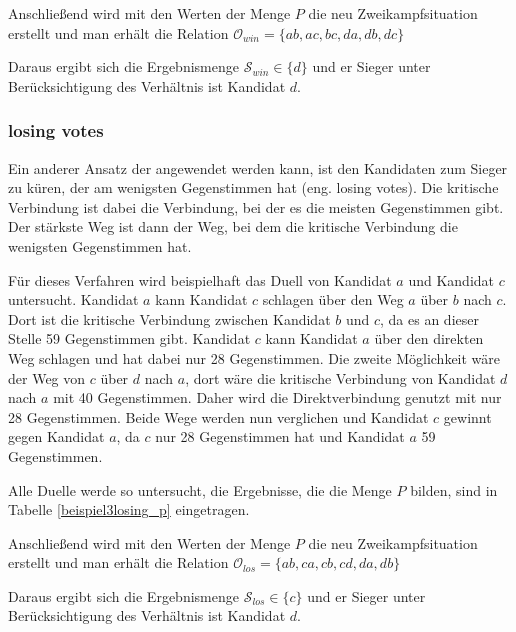 


Anschließend wird mit den Werten der Menge $P$ die neu Zweikampfsituation erstellt und man erhält die Relation $\mathcal{O}_{win} = \{ ab,ac,bc,da,db,dc \}$

Daraus ergibt sich die Ergebnismenge $\mathcal{S}_{win} \in \{d\}$ und er Sieger unter Berücksichtigung des Verhältnis ist Kandidat $d$.


\subsubsection{losing votes}
\label{sec:lose}
Ein anderer Ansatz der angewendet werden kann, ist den Kandidaten zum Sieger zu küren, der am wenigsten Gegenstimmen hat (eng. losing votes). Die kritische Verbindung ist dabei die Verbindung, bei der es die meisten Gegenstimmen gibt. Der stärkste Weg ist dann der Weg, bei dem die kritische Verbindung die wenigsten Gegenstimmen hat.

Für dieses Verfahren wird beispielhaft das Duell von Kandidat $a$ und Kandidat $c$ untersucht. Kandidat $a$ kann Kandidat $c$ schlagen über den Weg $a$ über $b$ nach $c$. Dort ist die kritische Verbindung zwischen Kandidat $b$ und $c$, da es an dieser Stelle 59 Gegenstimmen gibt. 
Kandidat $c$ kann Kandidat $a$ über den direkten Weg schlagen und hat dabei nur 28 Gegenstimmen. Die zweite Möglichkeit wäre der Weg von $c$ über $d$ nach $a$, dort wäre die kritische Verbindung von Kandidat $d$ nach $a$ mit 40 Gegenstimmen. Daher wird die Direktverbindung genutzt mit nur 28 Gegenstimmen.
Beide Wege werden nun verglichen und Kandidat $c$ gewinnt gegen Kandidat $a$, da $c$ nur 28 Gegenstimmen hat und Kandidat $a$ 59 Gegenstimmen.

Alle Duelle werde so untersucht, die Ergebnisse, die die Menge $P$ bilden, sind in Tabelle \ref{beispiel3losing_p} eingetragen.




Anschließend wird mit den Werten der Menge $P$ die neu Zweikampfsituation erstellt und man erhält die Relation $\mathcal{O}_{los} = \{ ab,ca,cb,cd,da,db \}$

Daraus ergibt sich die Ergebnismenge $\mathcal{S}_{los} \in \{c\}$ und er Sieger unter Berücksichtigung des Verhältnis ist Kandidat $d$.

